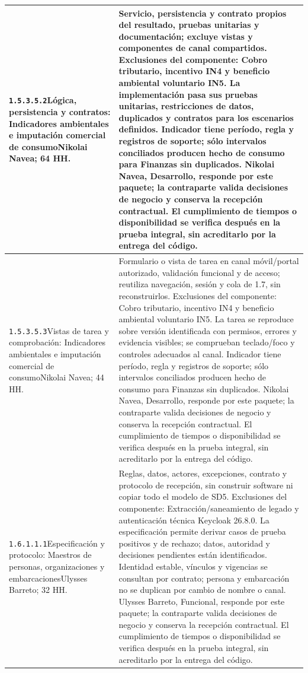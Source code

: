 \begin{longtable}{L{52mm}L{91mm}}
\texttt{1.\allowbreak{}5.\allowbreak{}3.\allowbreak{}5.\allowbreak{}2}\newline Lógica, persistencia y contratos: Indicadores ambientales e imputación comercial de consumo\newline Nikolai Navea; 64 HH. & Servicio, persistencia y contrato propios del resultado, pruebas unitarias y documentación; excluye vistas y componentes de canal compartidos. Exclusiones del componente: Cobro tributario, incentivo IN4 y beneficio ambiental voluntario IN5. La implementación pasa sus pruebas unitarias, restricciones de datos, duplicados y contratos para los escenarios definidos. Indicador tiene período, regla y registros de soporte; sólo intervalos conciliados producen hecho de consumo para Finanzas sin duplicados. Nikolai Navea, Desarrollo, responde por este paquete; la contraparte valida decisiones de negocio y conserva la recepción contractual. El cumplimiento de tiempos o disponibilidad se verifica después en la prueba integral, sin acreditarlo por la entrega del código.\\\hline
\texttt{1.\allowbreak{}5.\allowbreak{}3.\allowbreak{}5.\allowbreak{}3}\newline Vistas de tarea y comprobación: Indicadores ambientales e imputación comercial de consumo\newline Nikolai Navea; 44 HH. & Formulario o vista de tarea en canal móvil/portal autorizado, validación funcional y de acceso; reutiliza navegación, sesión y cola de 1.7, sin reconstruirlos. Exclusiones del componente: Cobro tributario, incentivo IN4 y beneficio ambiental voluntario IN5. La tarea se reproduce sobre versión identificada con permisos, errores y evidencia visibles; se comprueban teclado/foco y controles adecuados al canal. Indicador tiene período, regla y registros de soporte; sólo intervalos conciliados producen hecho de consumo para Finanzas sin duplicados. Nikolai Navea, Desarrollo, responde por este paquete; la contraparte valida decisiones de negocio y conserva la recepción contractual. El cumplimiento de tiempos o disponibilidad se verifica después en la prueba integral, sin acreditarlo por la entrega del código.\\\hline
\texttt{1.\allowbreak{}6.\allowbreak{}1.\allowbreak{}1.\allowbreak{}1}\newline Especificación y protocolo: Maestros de personas, organizaciones y embarcaciones\newline Ulysses Barreto; 32 HH. & Reglas, datos, actores, excepciones, contrato y protocolo de recepción, sin construir software ni copiar todo el modelo de SD5. Exclusiones del componente: Extracción/saneamiento de legado y autenticación técnica Keycloak 26.8.0. La especificación permite derivar casos de prueba positivos y de rechazo; datos, autoridad y decisiones pendientes están identificados. Identidad estable, vínculos y vigencias se consultan por contrato; persona y embarcación no se duplican por cambio de nombre o canal. Ulysses Barreto, Funcional, responde por este paquete; la contraparte valida decisiones de negocio y conserva la recepción contractual. El cumplimiento de tiempos o disponibilidad se verifica después en la prueba integral, sin acreditarlo por la entrega del código.\\\hline

\end{longtable}
